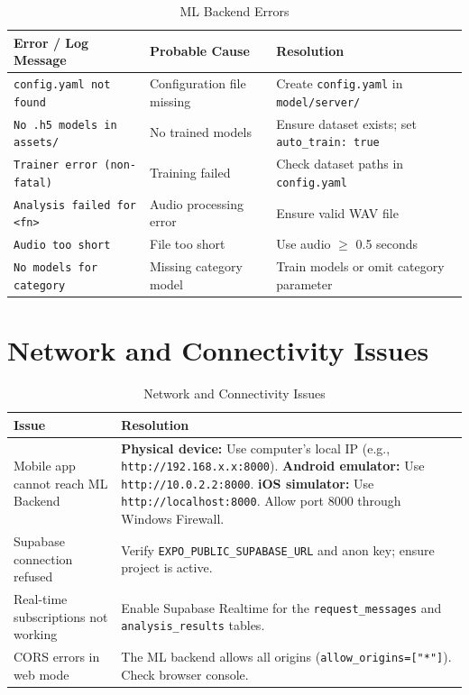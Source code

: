 \documentclass[10pt, a4paper, oneside]{report}
\begin{document}
\begin{table}[H]
\centering
\caption{ML Backend Errors}
\label{tab:backend-errors}
\begin{tabularx}{\textwidth}{p{4.2cm} p{4.2cm} X}
  \toprule
  \textbf{Error / Log Message} & \textbf{Probable Cause} & \textbf{Resolution} \\
  \midrule
  \texttt{config.yaml not found}     & Configuration file missing     & Create \texttt{config.yaml} in \texttt{model/server/} \\
  \texttt{No .h5 models in assets/}  & No trained models              & Ensure dataset exists; set \texttt{auto\_train: true} \\
  \texttt{Trainer error (non-fatal)} & Training failed                & Check dataset paths in \texttt{config.yaml} \\
  \texttt{Analysis failed for <fn>}  & Audio processing error         & Ensure valid WAV file \\
  \texttt{Audio too short}           & File too short                 & Use audio $\geq$ 0.5 seconds \\
  \texttt{No models for category}    & Missing category model         & Train models or omit category parameter \\
  \bottomrule
\end{tabularx}
\end{table}

\section{Network and Connectivity Issues}

\begin{table}[H]
\centering
\caption{Network and Connectivity Issues}
\label{tab:network-issues}
\begin{tabularx}{\textwidth}{p{4.2cm} X}
  \toprule
  \textbf{Issue} & \textbf{Resolution} \\
  \midrule
  Mobile app cannot reach ML Backend & \textbf{Physical device:} Use computer's local IP (e.g., \texttt{http://192.168.x.x:8000}). \textbf{Android emulator:} Use \texttt{http://10.0.2.2:8000}. \textbf{iOS simulator:} Use \texttt{http://localhost:8000}. Allow port 8000 through Windows Firewall. \\
  Supabase connection refused & Verify \texttt{EXPO\_PUBLIC\_SUPABASE\_URL} and anon key; ensure project is active. \\
  Real-time subscriptions not working & Enable Supabase Realtime for the \texttt{request\_messages} and \texttt{analysis\_results} tables. \\
  CORS errors in web mode & The ML backend allows all origins (\texttt{allow\_origins=["*"]}). Check browser console. \\
  \bottomrule
\end{tabularx}
\end{table}
\end{document}
